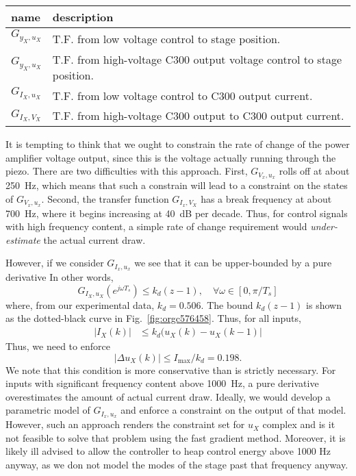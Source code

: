 \documentclass[journal,12pt,twocolumn,twoside]{IEEEtran/IEEEtran}
\begin{document}
\begin{table}
  \centering
  \begin{tabular}{ll}
    name & description\\
    \hline
    \(G_{y_{X},u_{X}}\) & \multirow{2}{2.5in}{T.F. from low voltage control to stage position.}\\
    &\\
    \(G_{y_{X},u_{X}}\) & \multirow{2}{2.5in}{T.F. from high-voltage C300 output voltage control to stage position.}\\
    &\\
    \(G_{I_{X},u_{X}}\) & \multirow{2}{2.5in}{T.F. from low voltage control to C300 output current.}\\
    &\\
    \(G_{I_{X},V_{X}}\) & \multirow{2}{2.5in}{T.F. from high-voltage C300 output to C300 output current.}\\
  \end{tabular}
  \label{tab:TFS}
\end{table}

It is tempting to think that we ought to constrain the rate of change of the power amplifier voltage output, since this is the voltage actually running through the piezo. There are two difficulties with this approach. First, \(G_{V_{x},u_{x}}\) rolls off at about 250~Hz, which means that such a constrain will lead to a constraint on the states of \(G_{V_{x},u_{x}}\). Second, the transfer function \(G_{I_{x}, V_{X}}\) has a break frequency at about 700~Hz, where it begins increasing at 40~dB per decade. Thus, for control signals with high frequency content, a simple rate of change requirement would \emph{under-estimate} the actual current draw.

However, if we consider \(G_{I_{x},u_{x}}\) we see that it can be upper-bounded by a pure derivative
In other words, 
\begin{equation}
G_{I_{X},u_{X}}(e^{j\omega T_{s}}) \leq k_d(z-1), \quad \forall \omega \in[0, \pi/T_s]
\end{equation}
where, from our experimental data, $k_d=0.506$. The bound $k_d(z-1)$ is shown as the dotted-black curve in Fig.~\ref{fig:orgc576458}. Thus, for all inputs,
\begin{align}
|I_{X}(k)| &\leq k_d(u_X(k) - u_X(k-1)|
\end{align}
Thus, we need to enforce
\begin{equation}
|\Delta u_X(k)| \leq I_{\text{max}}/k_d = 0.198. 
\end{equation}
We note that this condition is more conservative than is strictly necessary. For inputs with significant frequency content above 1000~Hz, a pure derivative overestimates the amount of actual current draw. Ideally, we would develop a parametric model of \(G_{I_{x},u_{x}}\) and enforce a constraint on the output of that model. However, such an approach renders the constraint set for $u_X$ complex and is it not feasible to solve that problem using the fast gradient method. Moreover, it is likely ill advised to allow the controller to heap control energy above 1000 Hz anyway, as we don not model the modes of the stage past that frequency anyway. 
\end{document}

